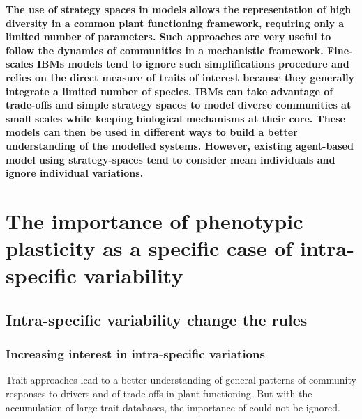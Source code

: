 %
%


\textbf{The use of strategy spaces in models allows the representation of high diversity in a common plant functioning framework, requiring only a limited number of parameters. Such approaches are very useful to follow the dynamics of communities in a mechanistic framework. Fine-scales IBMs models tend to ignore such simplifications procedure and relies on the direct measure of traits of interest because they generally integrate a limited number of species. IBMs can take advantage of trade-offs and simple strategy spaces to model diverse communities at small scales while keeping biological mechanisms at their core. These models can then be used in different ways to build a better understanding of the modelled systems. However, existing agent-based model using strategy-spaces tend to consider mean individuals and ignore individual variations.}


\chapter{The importance of phenotypic plasticity as a specific case of intra-specific variability}\label{chapter:PP_ISV}

\section{Intra-specific variability change the rules}


\subsection{Increasing interest in intra-specific variations}

Trait approaches lead to a better understanding of general patterns of community responses to drivers and of trade-offs in plant functioning. But with the accumulation of large trait databases, the importance of  could not be ignored.

